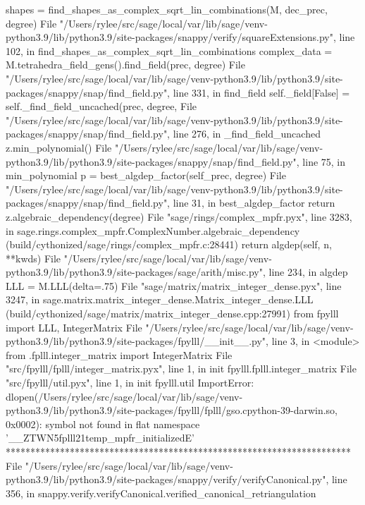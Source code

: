         shapes = find_shapes_as_complex_sqrt_lin_combinations(M, dec_prec, degree)
      File "/Users/rylee/src/sage/local/var/lib/sage/venv-python3.9/lib/python3.9/site-packages/snappy/verify/squareExtensions.py", line 102, in find_shapes_as_complex_sqrt_lin_combinations
        complex_data = M.tetrahedra_field_gens().find_field(prec, degree)
      File "/Users/rylee/src/sage/local/var/lib/sage/venv-python3.9/lib/python3.9/site-packages/snappy/snap/find_field.py", line 331, in find_field
        self._field[False] = self._find_field_uncached(prec, degree,
      File "/Users/rylee/src/sage/local/var/lib/sage/venv-python3.9/lib/python3.9/site-packages/snappy/snap/find_field.py", line 276, in _find_field_uncached
        z.min_polynomial()
      File "/Users/rylee/src/sage/local/var/lib/sage/venv-python3.9/lib/python3.9/site-packages/snappy/snap/find_field.py", line 75, in min_polynomial
        p = best_algdep_factor(self_prec, degree)
      File "/Users/rylee/src/sage/local/var/lib/sage/venv-python3.9/lib/python3.9/site-packages/snappy/snap/find_field.py", line 31, in best_algdep_factor
        return z.algebraic_dependency(degree)
      File "sage/rings/complex_mpfr.pyx", line 3283, in sage.rings.complex_mpfr.ComplexNumber.algebraic_dependency (build/cythonized/sage/rings/complex_mpfr.c:28441)
        return algdep(self, n, **kwds)
      File "/Users/rylee/src/sage/local/var/lib/sage/venv-python3.9/lib/python3.9/site-packages/sage/arith/misc.py", line 234, in algdep
        LLL = M.LLL(delta=.75)
      File "sage/matrix/matrix_integer_dense.pyx", line 3247, in sage.matrix.matrix_integer_dense.Matrix_integer_dense.LLL (build/cythonized/sage/matrix/matrix_integer_dense.cpp:27991)
        from fpylll import LLL, IntegerMatrix
      File "/Users/rylee/src/sage/local/var/lib/sage/venv-python3.9/lib/python3.9/site-packages/fpylll/__init__.py", line 3, in <module>
        from .fplll.integer_matrix import IntegerMatrix
      File "src/fpylll/fplll/integer_matrix.pyx", line 1, in init fpylll.fplll.integer_matrix
      File "src/fpylll/util.pyx", line 1, in init fpylll.util
    ImportError: dlopen(/Users/rylee/src/sage/local/var/lib/sage/venv-python3.9/lib/python3.9/site-packages/fpylll/fplll/gso.cpython-39-darwin.so, 0x0002): symbol not found in flat namespace '__ZTWN5fplll21temp_mpfr_initializedE'
**********************************************************************
File "/Users/rylee/src/sage/local/var/lib/sage/venv-python3.9/lib/python3.9/site-packages/snappy/verify/verifyCanonical.py", line 356, in snappy.verify.verifyCanonical.verified_canonical_retriangulation
